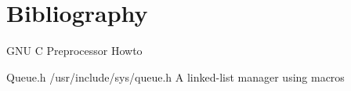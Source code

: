 \documentclass[8pt]{beamer}
\begin{document}
%
%

\section{Bibliography}

\begin{thebibliography}{3}

    GNU C Preprocessor Howto

    Queue.h
    \newblock /usr/include/sys/queue.h
    \newblock A linked-list manager using macros
\end{thebibliography}
\end{document}
